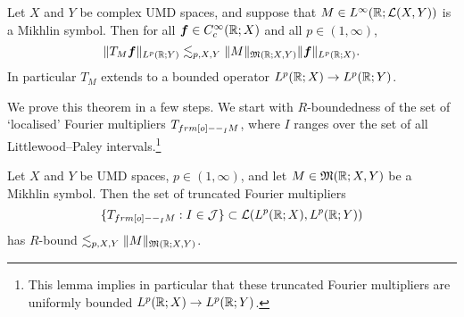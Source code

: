 \begin{thm}\label{thm:Mikhlin}
  Let $X$ and $Y$ be complex UMD spaces, and suppose that $M \in L^\infty(\mathbb{R};\mathcal{L}(X,Y))$ is a Mikhlin symbol.
  Then for all $\bm{f} \in C_{c}^\infty(\mathbb{R};X)$ and all $p \in (1,\infty)$,
  \begin{equation*}
    \|T_{M} \bm{f}\|_{L^p(\mathbb{R};Y)} \lesssim_{p,X,Y} \|M\|_{\mathfrak{M}(\mathbb{R};X,Y)} \|\bm{f}\|_{L^p(\mathbb{R};X)}.
  \end{equation*}
  In particular $T_{M}$ extends to a bounded operator $L^p(\mathbb{R};X) \to L^p(\mathbb{R};Y)$.
\end{thm}

We prove this theorem in a few steps.
We start with $R$-boundedness of the set of `localised' Fourier multipliers $T_{\1_{I} M}$, where $I$ ranges over the set of all Littlewood--Paley intervals.\footnote{This lemma implies in particular that these truncated Fourier multipliers are uniformly bounded $L^p(\mathbb{R};X) \to L^p(\mathbb{R};Y)$.}

\begin{lem}\label{lem:Mikhlin-components-R}
  Let $X$ and $Y$ be UMD spaces, $p \in (1,\infty)$, and let $M \in \mathfrak{M}(\mathbb{R};X,Y)$ be a Mikhlin symbol.
  Then the set of truncated Fourier multipliers
  \begin{equation*}
    \{T_{\1_{I} M} : I \in \mc{J}\} \subset \Lin(L^p(\R;X), L^p(\R;Y))
  \end{equation*}
  has $R$-bound $\lesssim_{p,X,Y} \|M\|_{\mathfrak{M}(\mathbb{R};X,Y)}$.
\end{lem}


